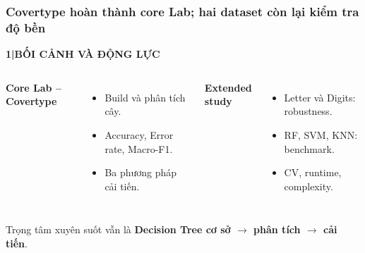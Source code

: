 \documentclass[aspectratio=169,12pt]{beamer}
\newcommand{\chaptertag}[2]{%
  \vspace{-0.16cm}%
  {\scriptsize\bfseries\textcolor{boxframe}{#1\enspace |\enspace #2}}\par
  \vspace{0.12cm}%
}
\begin{document}
\begin{frame}
  \frametitle{Covertype hoàn thành core Lab; hai dataset còn lại kiểm tra độ bền}
  \chaptertag{1}{BỐI CẢNH VÀ ĐỘNG LỰC}
  \begin{columns}[T,onlytextwidth]
      \textbf{Core Lab -- Covertype}
      \begin{itemize}
        \item Build và phân tích cây.
        \item Accuracy, Error rate, Macro-F1.
        \item Ba phương pháp cải tiến.
      \end{itemize}
      \textbf{Extended study}
      \begin{itemize}
        \item Letter và Digits: robustness.
        \item RF, SVM, KNN: benchmark.
        \item CV, runtime, complexity.
      \end{itemize}
  \end{columns}
  \vspace{0.35cm}
  \begin{tcolorbox}[focusbox,width=0.91\textwidth,top=2mm,bottom=2mm]
    \centering
    Trọng tâm xuyên suốt vẫn là \textbf{Decision Tree cơ sở $\rightarrow$ phân tích $\rightarrow$ cải tiến}.
  \end{tcolorbox}
\end{frame}
\end{document}
